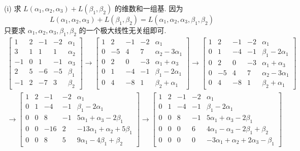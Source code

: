 \documentclass[11pt,a4paper,openany,oneside]{book}
\begin{document}
(i) 求 $ L(\alpha_1, \alpha_2, \alpha_3) + L(\beta_1, \beta_2) $ 的维数和一组基. 因为
 $$  L(\alpha_1, \alpha_2, \alpha_3) + L(\beta_1, \beta_2) = L(\alpha_1, \alpha_2, \alpha_3, \beta_1, \beta_2)  $$ 
只要求 $ \alpha_1, \alpha_2, \alpha_3, \beta_1, \beta_2 $ 的一个极大线性无关组即可.
\begin{gather*}
\begin{bmatrix}
1  &  2  &  -1  &  -2  &  \alpha_1  \\
3  &  1  &  1  &  1  &  \alpha_2  \\
-1  &  0  &  1  &  -1  &  \alpha_3  \\
2  &  5  &  -6  &  -5  &  \beta_1  \\
-1  &  2  &  -7  &  3  &  \beta_2  
\end{bmatrix} \longrightarrow
\begin{bmatrix}
1  &  2  &  -1  &  -2  &  \alpha_1  \\
0  &  -5  &  4  &  7  &  \alpha_2 - 3\alpha_1 \\
0  &  2  &  0  &  -3  &  \alpha_1 + \alpha_3  \\
0  &  1  &  -4  &  -1  &  \beta_1 - 2\alpha_1  \\
0  &  4  &  -8  &  1  &  \beta_2 + \alpha_1 
\end{bmatrix} \longrightarrow 
\begin{bmatrix}
1  &  2  &  -1  &  -2  &  \alpha_1  \\
0  &  1  &  -4  &  -1  &  \beta_1 - 2\alpha_1  \\
0  &  2  &  0  &  -3  &  \alpha_1 + \alpha_3  \\
0  &  -5  &  4  &  7  &  \alpha_2 - 3\alpha_1 \\
0  &  4  &  -8  &  1  &  \beta_2 + \alpha_1 
\end{bmatrix}
\end{gather*}
\begin{gather*}
\longrightarrow
\begin{bmatrix}
1  &  2  &  -1  &  -2  &  \alpha_1  \\
0  &  1  &  -4  &  -1  &  \beta_1 - 2\alpha_1  \\
0  &  0  &  8  &  -1  &  5\alpha_1 + \alpha_3 - 2\beta_1 \\
0  &  0  & -16 &  2   &  -13\alpha_1 + \alpha_2 + 5\beta_1  \\
0  &  0  &  8  &  5  &  9\alpha_1 - 4\beta_1 + \beta_2
\end{bmatrix} \longrightarrow 
\begin{bmatrix}
1  &  2  &  -1  &  -2  &  \alpha_1  \\
0  &  1  &  -4  &  -1  &  \beta_1 - 2\alpha_1  \\
0  &  0  &  8  &  -1  &  5\alpha_1 + \alpha_3 - 2\beta_1 \\
0  &  0  &  0  &  6   &  4\alpha_1 - \alpha_3 -2\beta_1 + \beta_2 \\
0  &  0  &  0  &  0  &  -3\alpha_1 + \alpha_2 + 2\alpha_3 -\beta_1 
\end{bmatrix}
\end{gather*} 
\end{document}

